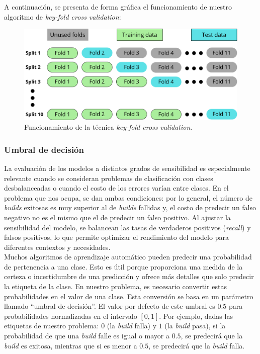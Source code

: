 A continuación, se presenta de forma gráfica el funcionamiento de nuestro algoritmo de
\textit{key-fold cross validation}:

\begin{figure}[H]
    \centering
    \includegraphics[scale=0.5]{images/Cross validation.pdf}
    \caption{Funcionamiento de la técnica \textit{key-fold cross validation}.}
    \label{fig:confusion_matrix}
\end{figure}

\subsubsection{Umbral de decisión}
La evaluación de los modelos a distintos grados de sensibilidad es especialmente relevante cuando
se consideran problemas de clasificación con clases desbalanceadas o cuando el costo de los
errores varían entre clases. En el problema que nos ocupa, se dan ambas condiciones: por lo
general, el número de \textit{builds} exitosas es muy superior al de \textit{builds} fallidas y,
el costo de predecir un falso negativo no es el mismo que el de predecir un falso positivo. Al
ajustar la sensibilidad del modelo, se balancean las tasas de verdaderos positivos
(\textit{recall}) y falsos positivos, lo que permite optimizar el rendimiento del modelo para
diferentes contextos y necesidades.\\

Muchos algoritmos de aprendizaje automático pueden predecir una probabilidad de
pertenencia a una clase. Esto es útil porque proporciona una medida de la certeza o incertidumbre
de una predicción y ofrece más detalles que solo predecir la etiqueta de la clase. En nuestro
problema, es necesario convertir estas probabilidades en el valor de una clase. Esta conversión
se basa en un parámetro llamado ``umbral de decisión''. El valor por defecto de este umbral
es $0.5$ para probabilidades normalizadas en el intervalo $[0, 1]$. Por ejemplo, dadas las
etiquetas de nuestro problema: $0$ (la \textit{build} falla) y $1$ (la \textit{build} pasa), si
la probabilidad de que una \textit{build} falle es igual o mayor a $0.5$, se predecirá que la
\textit{build} es exitosa, mientras que si es menor a $0.5$, se predecirá que la \textit{build}
falla.\\

